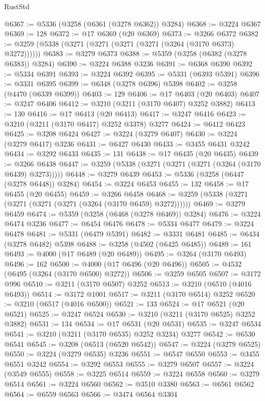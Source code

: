\begin{lexlean}{RustStd}
\begin{coremodule}
@6367 := @5336 (@3258 (@6361 (@3278 @6362)) @3284)
@6368 := @3224 @6367
@6369 := 128
@6372 := @17 @6369 (@20 @6369)
@6373 := @3266 @6372
@6382 := @3259 (@5338 (@3271 (@3271 (@3271 (@3271 (@3264 (@3170 @6373) @3272))))))
@6383 := @3279 @6373
@6388 := @5359 (@3258 (@6382 (@3278 @6383)) @3284)
@6390 := @3224 @6388 @3236
@6391 := @6368 @6390
@6392 := @5334 @6391
@6393 := @3224 @6392
@6395 := @5331 (@6393 @5391)
@6396 := @3331 @6395
@6399 := @6348 (@3278 @6396) @5398
@6402 := @3258 (@4470 (@6339 @6399))
@6403 := 129
@6406 := @17 @6403 (@20 @6403)
@6407 := @3247 @6406
@6412 := @3210 (@3211 (@3170 @6407) @3252 @3882)
@6413 := 130
@6416 := @17 @6413 (@20 @6413)
@6417 := @3247 @6416
@6423 := @3210 (@3211 (@3170 @6417) @3252 @3378) @3277
@6424 := @6412 @6423
@6425 := @3208 @6424
@6427 := @3224 (@3279 @6407)
@6430 := @3224 (@3279 @6417) @3236
@6431 := @6427 @6430
@6433 := @3455 @6431 @3242
@6434 := @3292 @6433
@6435 := 131
@6438 := @17 @6435 (@20 @6435)
@6439 := @3266 @6438
@6447 := @3259 (@5338 (@3271 (@3271 (@3271 (@3264 (@3170 @6439) @3273)))))
@6448 := @3279 @6439
@6453 := @5336 (@3258 (@6447 (@3278 @6448)) @3284)
@6454 := @3224 @6453
@6455 := 132
@6458 := @17 @6455 (@20 @6455)
@6459 := @3266 @6458
@6468 := @3259 (@5338 (@3271 (@3271 (@3271 (@3271 (@3264 (@3170 @6459) @3272))))))
@6469 := @3279 @6459
@6474 := @5359 (@3258 (@6468 (@3278 @6469)) @3284)
@6476 := @3224 @6474 @3236
@6477 := @6454 @6476
@6478 := @5334 @6477
@6479 := @3224 @6478
@6481 := @5331 (@6479 @5391)
@6482 := @3331 @6481
@6485 := @6434 (@3278 @6482) @5398
@6488 := @3258 (@4502 (@6425 @6485))
@6489 := 161
@6493 := @4000 (@17 @6489 (@20 @6489))
@6495 := @3264 (@3170 @6493)
@6496 := 162
@6500 := @4000 (@17 @6496 (@20 @6496))
@6505 := @4532 (@6495 (@3264 (@3170 @6500) @3272))
@6506 := @3259 @6505
@6507 := @3172 @996
@6510 := @3211 (@3170 @6507) @3252
@6513 := @3210 (@6510 (@4016 @6493))
@6514 := @3172 @1001
@6517 := @3211 (@3170 @6514) @3252
@6520 := @3210 (@6517 (@4016 @6500))
@6521 := 133
@6524 := @17 @6521 (@20 @6521)
@6525 := @3247 @6524
@6530 := @3210 (@3211 (@3170 @6525) @3252 @3882)
@6531 := 134
@6534 := @17 @6531 (@20 @6531)
@6535 := @3247 @6534
@6541 := @3210 (@3211 (@3170 @6535) @3252 @3234) @3277
@6542 := @6530 @6541
@6545 := @3208 (@6513 (@6520 @6542))
@6547 := @3224 (@3279 @6525)
@6550 := @3224 (@3279 @6535) @3236
@6551 := @6547 @6550
@6553 := @3455 @6551 @3242
@6554 := @3292 @6553
@6555 := @3279 @6507
@6557 := @3224 (@3549 @6555)
@6558 := @3225 @6514
@6559 := @3224 @6558
@6560 := @3279 @6514
@6561 := @3224 @6560
@6562 := @3510 @3380
@6563 := @6561 @6562
@6564 := @6559 @6563
@6566 := @3474 @6564 @3304

\end{coremodule}
\end{lexlean}
